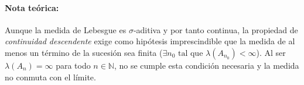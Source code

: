 \begin{problema}
\paragraph{Nota teórica:}
Aunque la medida de Lebesgue es $\sigma$-aditiva y por tanto continua, la propiedad de \textit{continuidad descendente} exige como hipótesis imprescindible que la medida de al menos un término de la sucesión sea finita ($\exists n_0 \text{ tal que } \lambda(A_{n_0}) < \infty$). Al ser $\lambda(A_n) = \infty$ para todo $n \in \mathbb{N}$, no se cumple esta condición necesaria y la medida no conmuta con el límite.
\end{problema}

\newpage

